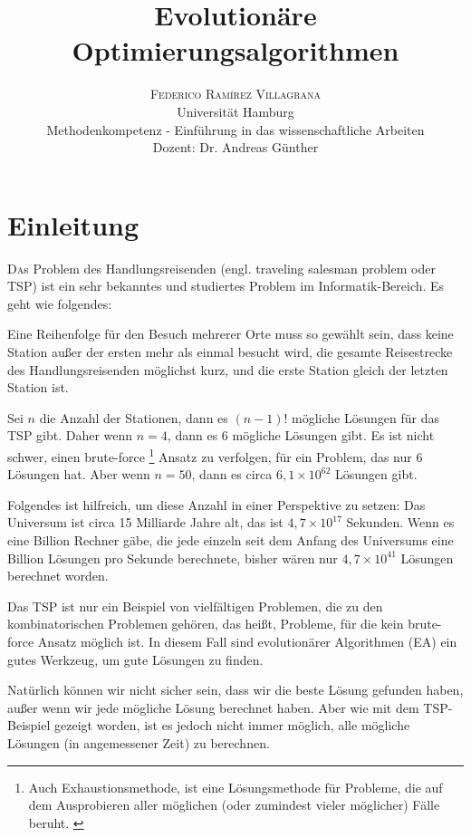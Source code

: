 \documentclass[twoside,twocolumn]{article}
\title{Evolutionäre Optimierungsalgorithmen} %
\author {
	\textsc{Federico Ramírez Villagrana} \\[1ex]
	\normalsize Universität Hamburg \\
	\normalsize Methodenkompetenz - Einführung in das wissenschaftliche Arbeiten \\
	\normalsize Dozent: Dr. Andreas Günther
}
\date{} %
\newcommand{\e}[1]{\times 10^{#1}}
\begin{document}
\maketitle


\section{Einleitung}
\lettrine[nindent=0em,lines=3]{D} as Problem des Handlungsreisenden (engl. traveling salesman problem oder TSP) ist ein sehr bekanntes und studiertes Problem im Informatik-Bereich. Es geht wie folgendes:\par
Eine Reihenfolge für den Besuch mehrerer Orte muss so gewählt sein, dass keine Station außer der ersten mehr als einmal besucht wird, die gesamte Reisestrecke des Handlungsreisenden möglichst kurz, und die erste Station gleich der letzten Station ist. \cite{wiki_tsp}\par
Sei $n$ die Anzahl der Stationen, dann es $(n-1)!$ mögliche Lösungen für das TSP gibt. Daher wenn $n=4$, dann es $6$ mögliche Lösungen gibt. Es ist nicht schwer, einen brute-force \footnote{Auch Exhaustionsmethode, ist eine Lösungsmethode für Probleme, die auf dem Ausprobieren aller möglichen (oder zumindest vieler möglicher) Fälle beruht. \cite{wiki_brute_force}} Ansatz zu verfolgen, für ein Problem, das nur 6 Lösungen hat. Aber wenn $n=50$, dann es circa $6,1\e{62}$ Lösungen gibt.\par
Folgendes ist hilfreich, um diese Anzahl in einer Perspektive zu setzen: Das Universum ist circa 15 Milliarde Jahre alt, das ist $4,7\e{17}$ Sekunden. Wenn es eine Billion Rechner gäbe, die jede einzeln seit dem Anfang des Universums eine Billion Lösungen pro Sekunde berechnete, bisher wären nur $4,7\e{41}$ Lösungen berechnet worden.\par
Das TSP ist nur ein Beispiel von vielfältigen Problemen, die zu den kombinatorischen Problemen gehören, das heißt, Probleme, für die kein brute-force Ansatz möglich ist. In diesem Fall sind evolutionärer Algorithmen (EA) ein gutes Werkzeug, um gute Lösungen zu finden.\par
Natürlich können wir nicht sicher sein, dass wir die beste Lösung gefunden haben, außer wenn wir jede mögliche Lösung berechnet haben. Aber wie mit dem TSP-Beispiel gezeigt worden, ist es jedoch nicht immer möglich, alle mögliche Lösungen (in angemessener Zeit) zu berechnen.
\end{document}
